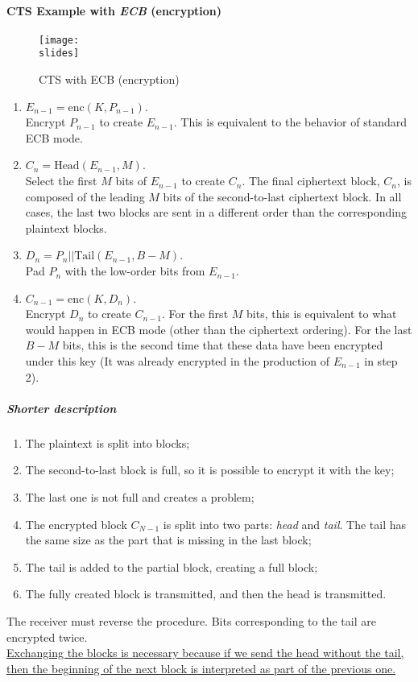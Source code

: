 \paragraph*{CTS Example with \textit{ECB} (encryption)}
\begin{figure}[h]
    \centering
    \texttt{[image: \\slides]}
    \caption{CTS with ECB (encryption)}
\end{figure}
\begin{enumerate}
    \item \(E_{n-1} = \text{enc}(K, P_{n-1})\).\\
    Encrypt \(P_{n-1}\) to create \(E_{n-1}\). This is equivalent to the behavior of standard ECB mode.
    \item \(C_n = \text{Head}(E_{n-1}, M)\).\\
    Select the first \(M\) bits of \(E_{n-1}\) to create \(C_n\). The final ciphertext block, \(C_n\), is composed of the leading \(M\) bits of the second-to-last ciphertext block. In all cases, the last two blocks are sent in a different order than the corresponding plaintext blocks.
    \item \(D_n = P_n || \text{Tail}(E_{n-1}, B-M)\).\\
    Pad \(P_n\) with the low-order bits from \(E_{n-1}\).
    \item \(C_{n-1} = \text{enc}(K, D_n)\).\\
    Encrypt \(D_n\) to create \(C_{n-1}\). For the first \(M\) bits, this is equivalent to what would happen in ECB mode (other than the ciphertext ordering). For the last \(B-M\) bits, this is the second time that these data have been encrypted under this key (It was already encrypted in the production of \(E_{n-1}\) in step 2).
\end{enumerate}



\subparagraph*{Shorter description}
\begin{enumerate}
    \item The plaintext is split into blocks;
    \item The second-to-last block is full, so it is possible to encrypt it with the key;
    \item The last one is not full and creates a problem;
    \item The encrypted block $C_{N-1}$ is split into two parts: \textit{head} and \textit{tail}. The tail has the same size as the part that is missing in the last block;
    \item The tail is added to the partial block, creating a full block;
    \item The fully created block is transmitted, and then the head is transmitted.
\end{enumerate}
The receiver must reverse the procedure. Bits corresponding to the tail are encrypted twice.\\ \ul{Exchanging the blocks is necessary because if we send the head without the tail, then the beginning of the next block is interpreted as part of the previous one.}

